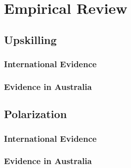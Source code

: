 \chapter{Empirical Review}

\section{Upskilling}

\subsection{International Evidence}

\subsection{Evidence in Australia}

\section{Polarization}

\subsection{International Evidence}

\subsection{Evidence in Australia}



